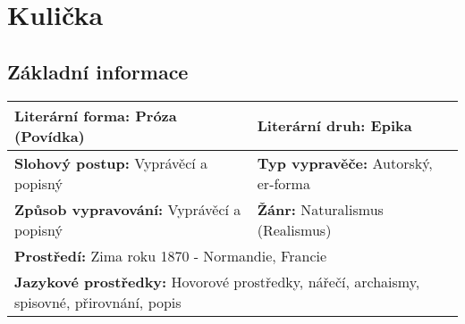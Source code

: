 \section{Kulička}
    \subsection*{Základní informace}
        \begin{center}
            \begin{tabular}{l|l}
                \textbf{Literární forma:} Próza (Povídka) & \textbf{Literární druh:} Epika \\
                \hline
                \textbf{Slohový postup:} Vyprávěcí a popisný & \textbf{Typ vypravěče:} Autorský, er-forma \\
                \hline
                \textbf{Způsob vypravování:} Vyprávěcí a popisný & \textbf{Žánr:} Naturalismus (Realismus) \\
                \hline
                \multicolumn{2}{l}{\textbf{Prostředí:} Zima roku 1870 - Normandie, Francie} \\
                \hline
                \multicolumn{2}{l}{\textbf{Jazykové prostředky:} Hovorové prostředky, nářečí, archaismy, spisovné, přirovnání, popis} \\
            \end{tabular}
        \end{center}
